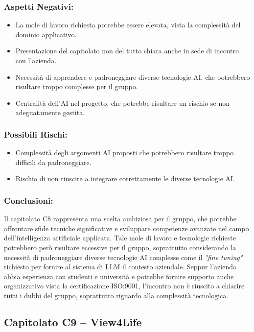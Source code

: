 \documentclass[a4paper,12pt]{article}
\begin{document}
\subsubsection*{Aspetti Negativi:}
\begin{itemize}
    \item La mole di lavoro richiesta potrebbe essere elevata, vista la complessità del dominio applicativo.
    \item Presentazione del capitolato non del tutto chiara anche in sede di incontro con l'azienda.
    \item Necessità di apprendere e padroneggiare diverse tecnologie AI, che potrebbero risultare troppo complesse per il gruppo.
    \item Centralità dell'AI nel progetto, che potrebbe risultare un rischio se non adeguatamente gestita.
\end{itemize}

\subsubsection*{Possibili Rischi:}
\begin{itemize}
    \item Complessità degli argomenti AI proposti che potrebbero risultare troppo difficili da padroneggiare.
    \item Rischio di non riuscire a integrare correttamente le diverse tecnologie AI.
\end{itemize}

\subsubsection*{Conclusioni:}
Il capitolato C8 rappresenta una scelta ambiziosa per il gruppo, che potrebbe affrontare sfide tecniche significative e sviluppare competenze avanzate nel campo dell'intelligenza artificiale applicata.
Tale mole di lavoro e tecnologie richieste potrebbero però risultare eccessive per il gruppo, soprattutto considerando la necessità di padroneggiare diverse tecnologie AI complesse come il \textit{"fine tuning"} richiesto per fornire al sistema di LLM il contesto aziendale. 
Seppur l'azienda abbia esperienza con studenti e università e potrebbe fornire supporto anche organizzativo vista la certificazione ISO:9001, l'incontro non è riuscito a chiarire tutti i dubbi del gruppo, soprattutto riguardo alla complessità tecnologica.
\vspace{2.0cm}


\subsection{Capitolato C9 – View4Life}
\end{document}
